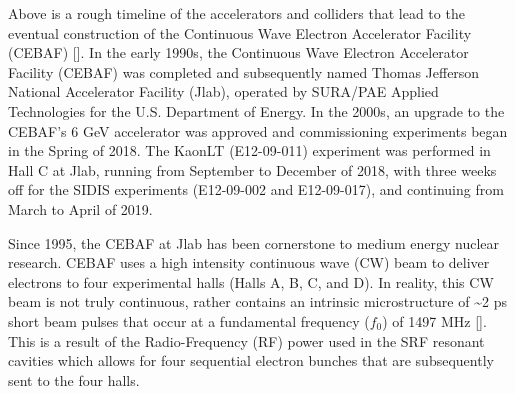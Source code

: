 \documentclass[
]{report}
\begin{document}
\begin{minipage}[t]{0.2\textwidth}
\end{minipage}
\hfill
\begin{minipage}[t]{0.7\textwidth}
\end{minipage}

Above is a rough timeline of the accelerators and colliders that lead to
the eventual construction of the Continuous Wave Electron Accelerator
Facility (CEBAF) {[}\cite{cahn_experimental_1989}{]}. In the early
1990s, the Continuous Wave Electron Accelerator Facility (CEBAF) was
completed and subsequently named Thomas Jefferson National Accelerator
Facility (Jlab), operated by SURA/PAE Applied Technologies for the U.S.
Department of Energy. In the 2000s, an upgrade to the CEBAF's 6 GeV
accelerator was approved and commissioning experiments began in the
Spring of 2018. The KaonLT (E12-09-011) experiment was performed in Hall
C at Jlab, running from September to December of 2018, with three weeks
off for the SIDIS experiments (E12-09-002 and E12-09-017), and
continuing from March to April of 2019.

\label{Chapter-2-1}

Since 1995, the CEBAF at Jlab has been cornerstone to medium energy
nuclear research. CEBAF uses a high intensity continuous wave (CW) beam
to deliver electrons to four experimental halls (Halls A, B, C, and D).
In reality, this CW beam is not truly continuous, rather contains an
intrinsic microstructure of \textasciitilde2 ps short beam pulses that
occur at a fundamental frequency (\(f_0\)) of 1497 MHz
{[}\cite{reece_continuous_2016}{]}. This is a result of the
Radio-Frequency (RF) power used in the SRF resonant cavities which
allows for four sequential electron bunches that are subsequently sent
to the four halls.
\end{document}
